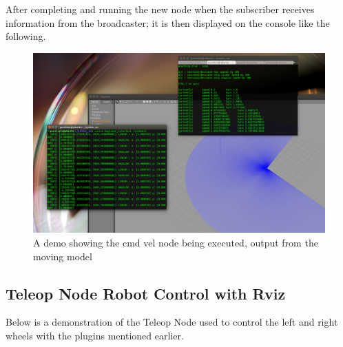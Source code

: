\documentclass[a4paper, 10pt]{IEEEconf}
\begin{document}
After completing and running the new node when the subscriber receives information from the broadcaster; it is then displayed on the console like the following.

\begin{figure}[H]
  \includegraphics[width=0.8\linewidth, center]{images/cmdvelsub}
  \caption{A demo showing the cmd vel node being executed, output from the moving model}
  \label{fig:A demo showing the cmd vel node being executed, output from the moving model}
\end{figure}


\clearpage
\subsection{Teleop Node Robot Control with Rviz}
Below is a demonstration of the Teleop Node used to control the left and right wheels with the plugins mentioned earlier.
\end{document}

